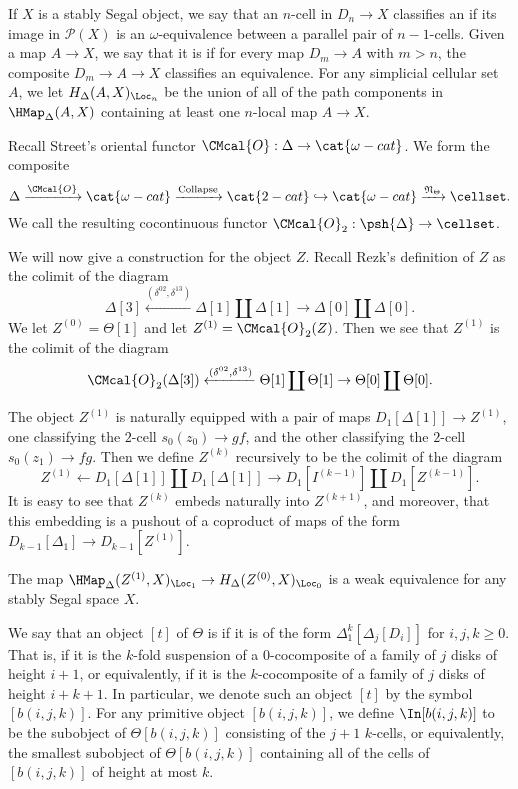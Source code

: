 \begin{defn} If \(X\) is a stably Segal object, we say that an \(n\)-cell in \(D_n\to X\) classifies an  if its image in \(\mathscr{P}(X)\) is an \(\omega\)-equivalence between a parallel pair of \(n-1\)-cells.  Given a map \(A\to X\), we say that it is  if for every map \(D_m \to A\) with \(m>n\), the composite \(D_m \to A\to X\) classifies an equivalence.   For any simplicial cellular set \(A\), we let  \(H_\Delta(A,X)_{\Loc_n}\)  be the union of all of the path components in \(\HMap_\Delta(A,X)\) containing at least one \(n\)-local map \(A\to X\).  
\end{defn}

Recall Street's oriental functor \(\CMcal{O}:\Delta\to \cat{\omega-cat}\). We form the composite \[\Delta\xrightarrow{\CMcal{O}} \cat{\omega-cat} \xrightarrow{\operatorname{Collapse}} \cat{2-cat} \hookrightarrow \cat{\omega-cat} \xrightarrow{\mathfrak{N}_\Theta} \cellset.\]  We call the resulting cocontinuous functor \(\CMcal{O}_2:\psh{\Delta} \to \cellset\).  

We will now give a construction for the object \(Z\).  Recall Rezk's definition of \(Z\)  as the colimit of the diagram \[\Delta[3] \xleftarrow{(\delta^{02},\delta^{13})} \Delta[1] \coprod \Delta[1] \to \Delta[0]\coprod \Delta[0].\]  We let \(Z^{(0)} = \Theta[1]\) and let \(Z^{(1)} = \CMcal{O}_2(Z)\).  Then we see that \(Z^{(1)}\) is the colimit of the diagram \[\CMcal{O}_2(\Delta[3]) \xleftarrow{(\delta^{02},\delta^{13})} \Theta[1] \coprod \Theta[1] \to \Theta[0]\coprod \Theta[0].\]

The object \(Z^{(1)}\) is naturally equipped with a pair of maps \(D_1[\Delta[1]] \to Z^{(1)}\), one classifying the \(2\)-cell \(s_0(z_0) \to gf\), and the other classifying the \(2\)-cell \(s_0(z_1)\to fg\).  Then we define \(Z^{(k)}\) recursively to be the colimit of the diagram\[Z^{(1)} \leftarrow D_1[\Delta[1]]\coprod D_1[\Delta[1]] \to D_1[I^{(k-1)}] \coprod D_1[Z^{(k-1)}].  \]  It is easy to see that \(Z^{(k)}\) embeds naturally into \(Z^{(k+1)}\), and moreover, that this embedding is a pushout of a coproduct of maps of the form \(D_{k-1}[\Delta_1] \to D_{k-1}[Z^{(1)}]\).  

\begin{lemma} The map \(\HMap_\Delta(Z^{(1)},X)_{\Loc_1} \to H_\Delta(Z^{(0)},X)_{\Loc_0}\) is a weak equivalence for any stably Segal space \(X\).  
\end{lemma}
\begin{defn} We say that an object \([t]\) of \(\Theta\) is  if it is of the form \(\Delta_1^k[\Delta_j[D_i]]\) for \(i,j,k\geq 0\).  That is, if it is the \(k\)-fold suspension of a \(0\)-cocomposite of a family of \(j\) disks of height \(i+1\), or equivalently, if it is the \(k\)-cocomposite of a family of \(j\) disks of height \(i+k+1\).  In particular, we denote such an object \([t]\) by the symbol \([b(i,j,k)]\).    For any primitive object \([b(i,j,k)]\), we define \(\In[b(i,j,k)]\) to be the subobject of \(\Theta[b(i,j,k)]\) consisting of the \(j+1\) \(k\)-cells, or equivalently, the smallest subobject of \(\Theta[b(i,j,k)]\) containing all of the cells of \([b(i,j,k)]\) of height at most \(k\).  
\end{defn}

